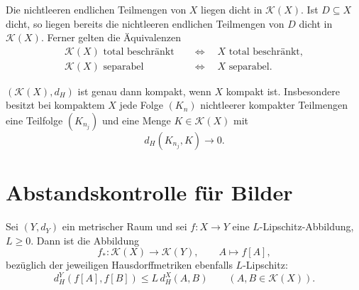 \begin{theorem}
\label{b47guide:thm:hausdorff-approximation}
Die nichtleeren endlichen Teilmengen von $X$ liegen dicht in
$\mathcal K(X)$. Ist $D\subseteq X$ dicht, so liegen bereits die
nichtleeren endlichen Teilmengen von $D$ dicht in $\mathcal K(X)$.
Ferner gelten die Äquivalenzen
\[
\begin{aligned}
 \mathcal K(X)\text{ total beschränkt}
   &\quad\Longleftrightarrow\quad X\text{ total beschränkt},\\
 \mathcal K(X)\text{ separabel}
   &\quad\Longleftrightarrow\quad X\text{ separabel}.
\end{aligned}
\]
\end{theorem}

\begin{theorem}
\label{b47guide:thm:blaschke}
$(\mathcal K(X),d_H)$ ist genau dann kompakt, wenn $X$ kompakt ist.
Insbesondere besitzt bei kompaktem $X$ jede Folge $(K_n)$ nichtleerer
kompakter Teilmengen eine Teilfolge $(K_{n_j})$ und eine Menge
$K\in\mathcal K(X)$ mit
\[
 d_H(K_{n_j},K)\longrightarrow0.
\]
\cite{hausdorff-notes}
\end{theorem}

\section{Abstandskontrolle für Bilder}

\begin{theorem}
\label{b47guide:thm:hausdorff-images}
Sei $(Y,d_Y)$ ein metrischer Raum und sei $f:X\to Y$ eine
$L$-Lipschitz-Abbildung, $L\geq0$. Dann ist die Abbildung
\[
 f_*:\mathcal K(X)\longrightarrow\mathcal K(Y),\qquad A\longmapsto f[A],
\]
bezüglich der jeweiligen Hausdorffmetriken ebenfalls $L$-Lipschitz:
\[
 d_H^{Y}(f[A],f[B])\leq L\,d_H^{X}(A,B)
 \qquad(A,B\in\mathcal K(X)).
\]
\end{theorem}